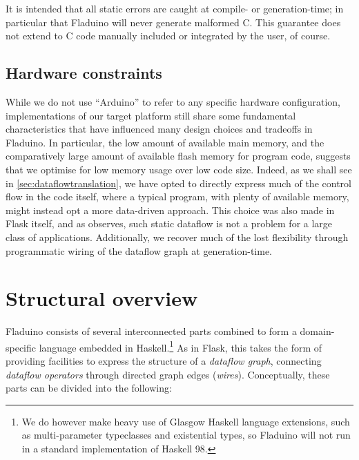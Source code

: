 \documentclass[a4paper, oneside, final]{memoir}
\begin{document}
It is intended that all static errors are caught at compile- or
generation-time; in particular that Fladuino will never generate
malformed C.  This guarantee does not extend to C code manually
included or integrated by the user, of course.

\subsection{Hardware constraints}

While we do not use ``Arduino'' to refer to any specific hardware
configuration, implementations of our target platform still share some
fundamental characteristics that have influenced many design choices
and tradeoffs in Fladuino.  In particular, the low amount of available
main memory, and the comparatively large amount of available flash
memory for program code, suggests that we optimise for low memory
usage over low code size.  Indeed, as we shall see in
\ref{sec:dataflowtranslation}, we have opted to directly express much of
the control flow in the code itself, where a typical program, with
plenty of available memory, might instead opt a more data-driven
approach.  This choice was also made in Flask itself, and as
\cite{flask08} observes, such static dataflow is not a problem for a
large class of applications.  Additionally, we recover much of the
lost flexibility through programmatic wiring of the dataflow graph at
generation-time.

\section{Structural overview}

Fladuino consists of several interconnected parts combined to form a
domain-specific language embedded in Haskell.\footnote{We do however
  make heavy use of Glasgow Haskell language extensions, such as
  multi-parameter typeclasses and existential types, so Fladuino will
  not run in a standard implementation of Haskell 98.}  As in Flask,
this takes the form of providing facilities to express the structure
of a \textit{dataflow graph}, connecting \textit{dataflow operators}
through directed graph edges (\textit{wires}).  Conceptually, these
parts can be divided into the following:
\end{document}
